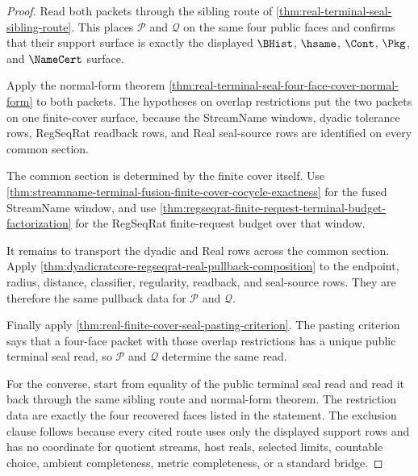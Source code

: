 \begin{proof}
Read both packets through the sibling route of
\autoref{thm:real-terminal-seal-sibling-route}. This places $\mathcal P$ and
$\mathcal Q$ on the same four public faces and confirms that their support
surface is exactly the displayed $\BHist$, $\hsame$, $\Cont$, $\Pkg$, and
$\NameCert$ surface.

Apply the normal-form theorem
\autoref{thm:real-terminal-seal-four-face-cover-normal-form} to both packets.
The hypotheses on overlap restrictions put the two packets on one
finite-cover surface, because the StreamName windows, dyadic tolerance rows,
RegSeqRat readback rows, and Real seal-source rows are identified on every
common section.

The common section is determined by the finite cover itself. Use
\autoref{thm:streamname-terminal-fusion-finite-cover-cocycle-exactness} for
the fused StreamName window, and use
\autoref{thm:regseqrat-finite-request-terminal-budget-factorization} for the
RegSeqRat finite-request budget over that window.

It remains to transport the dyadic and Real rows across the common section.
Apply \autoref{thm:dyadicratcore-regseqrat-real-pullback-composition} to the
endpoint, radius, distance, classifier, regularity, readback, and seal-source
rows. They are therefore the same pullback data for $\mathcal P$ and
$\mathcal Q$.

Finally apply \autoref{thm:real-finite-cover-seal-pasting-criterion}. The
pasting criterion says that a four-face packet with those overlap
restrictions has a unique public terminal seal read, so $\mathcal P$ and
$\mathcal Q$ determine the same read.

For the converse, start from equality of the public terminal seal read and
read it back through the same sibling route and normal-form theorem. The
restriction data are exactly the four recovered faces listed in the statement.
The exclusion clause follows because every cited route uses only the displayed
support rows and has no coordinate for quotient streams, host reals, selected
limits, countable choice, ambient completeness, metric completeness, or a
standard bridge.
\end{proof}


